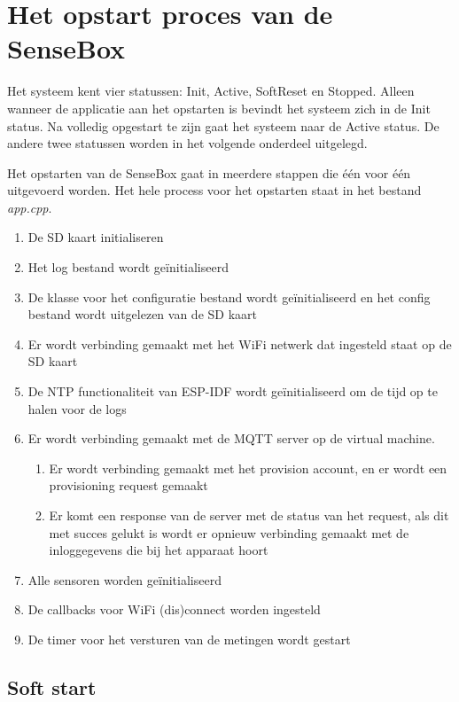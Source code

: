 \section{Het opstart proces van de SenseBox}

Het systeem kent vier statussen: Init, Active, SoftReset en Stopped. Alleen wanneer de applicatie aan het opstarten is bevindt het systeem zich in de Init status. Na volledig opgestart te zijn gaat het systeem naar de Active status. De andere twee statussen worden in het volgende onderdeel uitgelegd.

\vspace{1em}
Het opstarten van de SenseBox gaat in meerdere stappen die één voor één uitgevoerd worden. Het hele process voor het opstarten staat in het bestand \emph{app.cpp}.

\begin{enumerate}
  \item De SD kaart initialiseren
  \item Het log bestand wordt geïnitialiseerd
  \item De klasse voor het configuratie bestand wordt geïnitialiseerd en het config bestand wordt uitgelezen van de SD kaart
  \item Er wordt verbinding gemaakt met het WiFi netwerk dat ingesteld staat op de SD kaart
  \item De NTP functionaliteit van ESP-IDF wordt geïnitialiseerd om de tijd op te halen voor de logs
  \item Er wordt verbinding gemaakt met de MQTT server op de virtual machine.
  \begin{enumerate}
    \item Er wordt verbinding gemaakt met het provision account, en er wordt een provisioning request gemaakt
    \item Er komt een response van de server met de status van het request, als dit met succes gelukt is wordt er opnieuw verbinding gemaakt met de inloggegevens die bij het apparaat hoort
  \end{enumerate}
  \item Alle sensoren worden geïnitialiseerd
  \item De callbacks voor WiFi (dis)connect worden ingesteld
  \item De timer voor het versturen van de metingen wordt gestart
\end{enumerate}

\subsection{Soft start}

